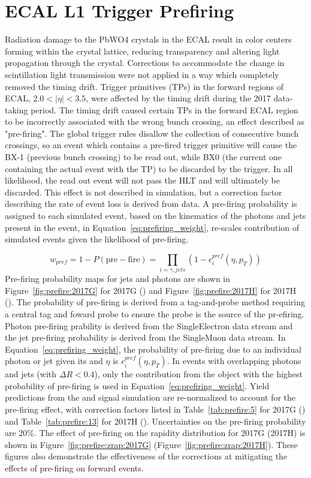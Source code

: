 \section{ECAL L1 Trigger Prefiring}\label{ch:prefire}
Radiation damage to the PbWO4 crystals in the ECAL result in color centers forming within the crystal lattice, reducing transparency and altering light propagation through the crystal. Corrections to accommodate the change in scintillation light transmission were not applied in a way which completely removed the timing drift. Trigger primitives (TPs) in the forward regions of ECAL, $2.0 < |\eta| < 3.5$, were affected by the timing drift during the 2017 data-taking period. The timing drift caused certain TPs in the forward ECAL region to be incorrectly associated with the wrong bunch crossing, an effect described as "pre-firing". The global trigger rules disallow the collection of consecutive bunch crossings, so an event which contains a pre-fired trigger primitive will cause the BX-1 (previous bunch crossing) to be read out, while BX0 (the current one containing the actual event with the TP) to be discarded by the trigger. In all likelihood, the read out event will not pass the HLT and will ultimately be discarded.
This effect is not described in simulation, but a correction factor describing the rate of event loss is derived from data. A pre-firing probability is assigned to each simulated event, based on the kinematics of the photons and jets present in the event, in Equation~\ref{eq:prefiring_weight}, re-scales contribution of simulated events given the likelihood of pre-firing.

\begin{equation}
    w_{pref} = 1 - P(\mathrm{pre-fire}) = \prod_{i=\gamma,jets}{(1 - \epsilon_i^{pref}(\eta,p_T))}
    \label{eq:prefiring_weight}
\end{equation}
Pre-firing probability maps for jets and photons are shown in Figure~\ref{fig:prefire:2017G} for 2017G (\serag) and Figure~\ref{fig:prefire:2017H} for 2017H (\serah). The probability of pre-firing is derived from a tag-and-probe method requiring a central tag and foward probe to ensure the probe is the source of the pr-efiring. Photon pre-firing prability is derived from the SingleElectron data stream and the jet pre-firing probability is derived from the SingleMuon data stream. In Equation~\ref{eq:prefiring_weight}, the probability of pre-firing due to an individual photon or jet given its \pt and $\eta$ is $\epsilon_i^{pref}(\eta,p_T)$. In events with overlapping photons and jets (with $\Delta  R < 0.4$), only the contribution from the object with the highest probability of pre-firing is used in Equation~\ref{eq:prefiring_weight}\cite{LATHOMAS}. Yield predictions from the \Wpm and \Z signal simulation are re-normalized to account for the pre-firing effect, with correction factors listed in Table~\ref{tab:prefire:5} for 2017G (\serag) and Table~\ref{tab:prefire:13} for 2017H (\serah). Uncertainties on the pre-firing probability are 20\%. The effect of pre-firing on the \zee rapidity distribution for 2017G (2017H) is shown in  Figure~\ref{fig:prefire:zrap:2017G} (Figure~\ref{fig:prefire:zrap:2017H}). These figures also demonstrate the effectiveness of the corrections at mitigating the effects of pre-firing on forward events.
